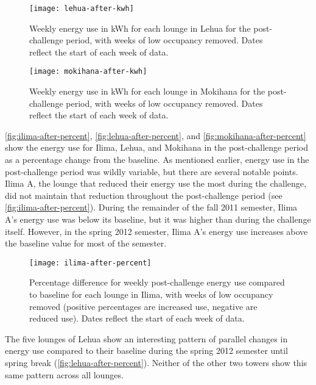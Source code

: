 \begin{figure}[htbp]
	\centering
	\texttt{[image: lehua-after-kwh]}
	\caption[Weekly post-challenge energy use for each lounge in Lehua]{Weekly energy use in kWh for each lounge in Lehua for the post-challenge period, with weeks of low occupancy removed. Dates reflect the start of each week of data.}
	\label{fig:lehua-after-kwh}
\end{figure}

\begin{figure}[htbp]
	\centering
	\texttt{[image: mokihana-after-kwh]}
	\caption[Weekly post-challenge energy use for each lounge in Mokihana]{Weekly energy use in kWh for each lounge in Mokihana for the post-challenge period, with weeks of low occupancy removed. Dates reflect the start of each week of data.}
	\label{fig:mokihana-after-kwh}
\end{figure}

\autoref{fig:ilima-after-percent}, \autoref{fig:lehua-after-percent}, and \autoref{fig:mokihana-after-percent} show the energy use for Ilima, Lehua, and Mokihana in the post-challenge period as a percentage change from the baseline. As mentioned earlier, energy use in the post-challenge period was wildly variable, but there are several notable points. Ilima A, the lounge that reduced their energy use the most during the challenge, did not maintain that reduction throughout the post-challenge period (see \autoref{fig:ilima-after-percent}). During the remainder of the fall 2011 semester, Ilima A's energy use was below its baseline, but it was higher than during the challenge itself. However, in the spring 2012 semester, Ilima A's energy use increases above the baseline value for most of the semester.

\begin{figure}[htbp]
	\centering
	\texttt{[image: ilima-after-percent]}
	\caption[Percentage post-challenge energy use difference from baseline for Ilima]{Percentage difference for weekly post-challenge energy use compared to baseline for each lounge in Ilima, with weeks of low occupancy removed (positive percentages are increased use, negative are reduced use). Dates reflect the start of each week of data.}
	\label{fig:ilima-after-percent}
\end{figure}

The five lounges of Lehua show an interesting pattern of parallel changes in energy use compared to their baseline during the spring 2012 semester until spring break (\autoref{fig:lehua-after-percent}). Neither of the other two towers show this same pattern across all lounges.

